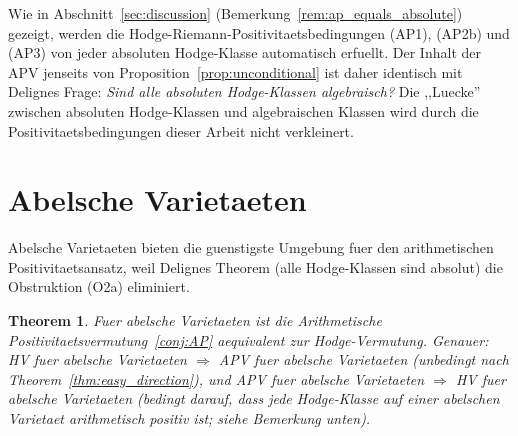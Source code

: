 \documentclass[aps,prd,twocolumn,superscriptaddress,nofootinbib]{revtex4-2}
\newtheorem{theorem}{Theorem}[section]
\theoremstyle{definition}
\theoremstyle{remark}
\begin{document}
Wie in Abschnitt~\ref{sec:discussion} (Bemerkung~\ref{rem:ap_equals_absolute}) gezeigt, werden die Hodge-Riemann-Positivitaetsbedingungen (AP1), (AP2b) und (AP3) von jeder absoluten Hodge-Klasse automatisch erfuellt. Der Inhalt der APV jenseits von Proposition~\ref{prop:unconditional} ist daher identisch mit Delignes Frage: \textit{Sind alle absoluten Hodge-Klassen algebraisch?} Die ,,Luecke'' zwischen absoluten Hodge-Klassen und algebraischen Klassen wird durch die Positivitaetsbedingungen dieser Arbeit nicht verkleinert.


\section{Abelsche Varietaeten}
\label{sec:abelian}

Abelsche Varietaeten bieten die guenstigste Umgebung fuer den arithmetischen Positivitaetsansatz, weil Delignes Theorem (alle Hodge-Klassen sind absolut) die Obstruktion (O2a) eliminiert.

\begin{theorem}
\label{thm:abelian}
Fuer abelsche Varietaeten ist die Arithmetische Positivitaetsvermutung~\ref{conj:AP} aequivalent zur Hodge-Vermutung. Genauer: HV fuer abelsche Varietaeten $\Rightarrow$ APV fuer abelsche Varietaeten (unbedingt nach Theorem~\ref{thm:easy_direction}), und APV fuer abelsche Varietaeten $\Rightarrow$ HV fuer abelsche Varietaeten (bedingt darauf, dass jede Hodge-Klasse auf einer abelschen Varietaet arithmetisch positiv ist; siehe Bemerkung unten).
\end{theorem}
\end{document}

